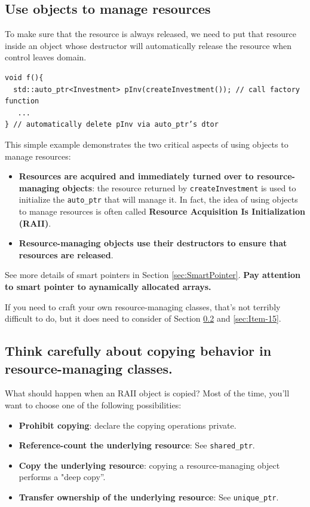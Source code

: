 \documentclass[a4paper,twoside]{article}
\theoremstyle{definition}
\theoremstyle{remark}
\numberwithin{equation}{section}
\let\OldTexttt\texttt
\renewcommand{\texttt}[1]{{\color{blue} \OldTexttt{#1}}}
\begin{document}
\subsection{Use objects to manage resources}
\label{sec:Item-13}

To make sure that the resource  is always released, we need to put
that resource inside an object whose destructor will automatically
release the resource when control leaves domain.
\begin{verbatim}
void f(){
  std::auto_ptr<Investment> pInv(createInvestment()); // call factory function
   ... 
} // automatically delete pInv via auto_ptr’s dtor
\end{verbatim}

This simple example demonstrates the two critical aspects of using
objects to manage resources:
\begin{itemize}
\item \textbf{Resources are acquired and immediately turned over to
  resource-managing objects}: the resource returned by
  \texttt{createInvestment} 
  is used to initialize the \texttt{auto\_ptr} that will manage it. In 
fact, the idea of using objects to manage resources is often called
\textbf{Resource Acquisition Is Initialization (RAII)}.
\item \textbf{Resource-managing objects use their destructors to ensure
that resources are released}.
\end{itemize}

See more details of smart pointers in Section \ref{sec:SmartPointer}.
\textbf{Pay attention to smart pointer to aynamically allocated arrays.}

If you need to craft your own resource-managing
classes, that's not terribly difficult to do, but it does need to
consider of Section \ref{sec:Item-14} and \ref{sec:Item-15}.

\subsection{Think carefully about copying behavior in
  resource-managing classes.}
\label{sec:Item-14}

What should happen when an RAII object is copied? Most of the time,
you'll want to choose one of the following possibilities:

\begin{itemize}
\item \textbf{Prohibit copying}: declare the copying operations
  private.
\item \textbf{Reference-count the underlying resource}: See
  \texttt{shared\_ptr}.
\item \textbf{Copy the underlying resource}: copying a
  resource-managing object performs a "deep copy''.
\item \textbf{Transfer ownership of the underlying resource}: See \texttt{unique\_ptr}.
\end{itemize}
\end{document}
